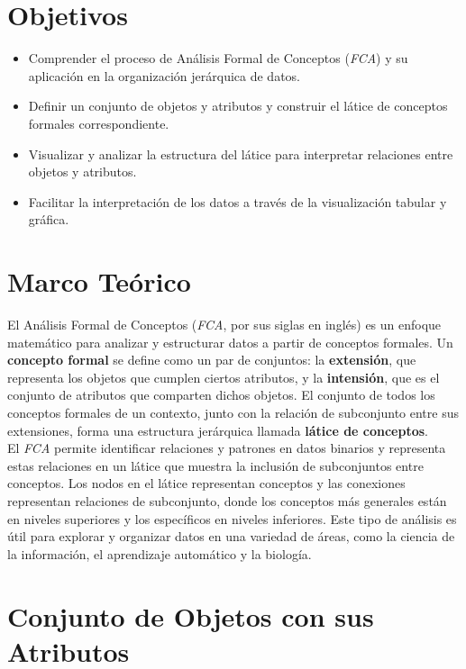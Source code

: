 \section{Objetivos}
\begin{itemize}
    \item Comprender el proceso de Análisis Formal de Conceptos (\textit{FCA}) y su aplicación en la organización jerárquica de datos.
    \item Definir un conjunto de objetos y atributos y construir el látice de conceptos formales correspondiente.
    \item Visualizar y analizar la estructura del látice para interpretar relaciones entre objetos y atributos.
    \item Facilitar la interpretación de los datos a través de la visualización tabular y gráfica.
\end{itemize}

\section{Marco Teórico}

El Análisis Formal de Conceptos (\textit{FCA}, por sus siglas en inglés) es un enfoque matemático para analizar y estructurar datos a partir de conceptos formales. Un \textbf{concepto formal} se define como un par de conjuntos: la \textbf{extensión}, que representa los objetos que cumplen ciertos atributos, y la \textbf{intensión}, que es el conjunto de atributos que comparten dichos objetos. El conjunto de todos los conceptos formales de un contexto, junto con la relación de subconjunto entre sus extensiones, forma una estructura jerárquica llamada \textbf{látice de conceptos}.\\


El \textit{FCA} permite identificar relaciones y patrones en datos binarios y representa estas relaciones en un látice que muestra la inclusión de subconjuntos entre conceptos. Los nodos en el látice representan conceptos y las conexiones representan relaciones de subconjunto, donde los conceptos más generales están en niveles superiores y los específicos en niveles inferiores. Este tipo de análisis es útil para explorar y organizar datos en una variedad de áreas, como la ciencia de la información, el aprendizaje automático y la biología.

\section{Conjunto de Objetos con sus Atributos}

